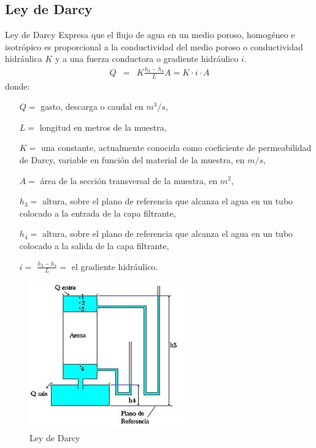 \documentclass[spanish]{beamer}
\begin{document}
\subsection{Ley de Darcy}
\begin{frame}{Ley de Darcy}
Expresa que el flujo de agua en un medio poroso, homogéneo e isotrópico es proporcional 
a la conductividad del medio poroso o conductividad hidráulica $K$ y a una fuerza conductora o gradiente hidráulico $i$.
\begin{eqnarray}
Q&=&K \frac{h_3 - h_4}{L} A = K \cdot i \cdot A \label{darcy_formula}
\end{eqnarray}
donde:
\end{frame}
\begin{frame}
\begin{itemize}
	\item[$Q=$] gasto, descarga o caudal en $m^3/s$,
	\item[$L=$] longitud en metros de la muestra, %
	\item[$K=$] una constante, actualmente conocida como coeficiente de permeabilidad de Darcy, variable en función del material de la muestra, en $m/s$,
	\item[$A=$] área de la sección transversal de la muestra, en $m^2$,
	\item[$h_3=$] altura, sobre el plano de referencia que alcanza el agua en un tubo colocado a la entrada de la capa filtrante,
	\item[$h_4=$] altura, sobre el plano de referencia que alcanza el agua en un tubo colocado a la salida de la capa filtrante,
	\item[$i=$] $\frac{h_3 - h_4}{L}=$ el gradiente hidráulico.
\end{itemize}
\end{frame}
\begin{frame}
%
\begin{figure}[tbhp]
\centerline{\includegraphics[scale=0.6]{../img/darcy_grafica}}
\caption{Ley de Darcy}
\label{graf_leydarcy}
\end{figure}
\end{frame}
\end{document}
